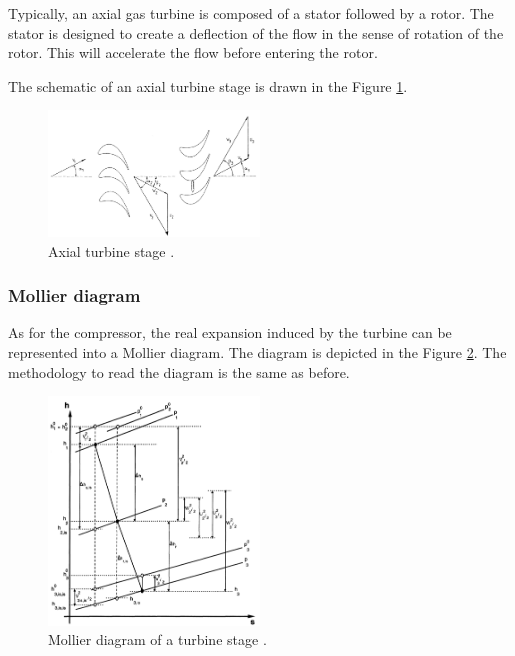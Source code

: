 Typically, an axial gas turbine is composed of a stator followed by a rotor. The stator is designed to create a deflection of the flow in the sense of rotation of the rotor. This will accelerate the flow before entering the rotor.

The schematic of an axial turbine stage is drawn in the Figure \ref{fig:C4_turbstage}.
\begin{figure}[h]
    \centering
    \includegraphics[width=0.5\textwidth]{Turb_stage.png}
    \caption{Axial turbine stage \cite{Hillewaert2019}.}
    \label{fig:C4_turbstage}
\end{figure}
\subsubsection{Mollier diagram}
As for the compressor, the real expansion induced by the turbine can be represented into a Mollier diagram. The diagram is depicted in the Figure \ref{fig:C4_Mollierturb}. The methodology to read the diagram is the same as before.

\begin{figure}[h]
    \centering
    \includegraphics[width=0.5\textwidth]{Turb_mollier.png}
    \caption{Mollier diagram of a turbine stage \cite{Hillewaert2019}.}
    \label{fig:C4_Mollierturb}
\end{figure}

